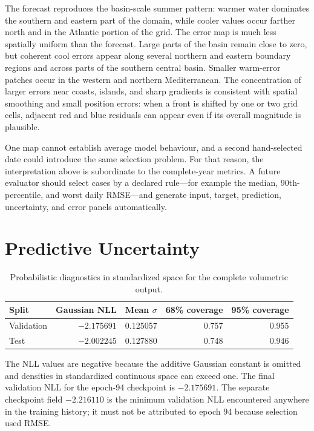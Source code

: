 The forecast reproduces the basin-scale summer pattern: warmer water dominates the southern and eastern part of the domain, while cooler values occur farther north and in the Atlantic portion of the grid. The error map is much less spatially uniform than the forecast. Large parts of the basin remain close to zero, but coherent cool errors appear along several northern and eastern boundary regions and across parts of the southern central basin. Smaller warm-error patches occur in the western and northern Mediterranean. The concentration of larger errors near coasts, islands, and sharp gradients is consistent with spatial smoothing and small position errors: when a front is shifted by one or two grid cells, adjacent red and blue residuals can appear even if its overall magnitude is plausible.

One map cannot establish average model behaviour, and a second hand-selected date could introduce the same selection problem. For that reason, the interpretation above is subordinate to the complete-year metrics. A future evaluator should select cases by a declared rule---for example the median, 90th-percentile, and worst daily RMSE---and generate input, target, prediction, uncertainty, and error panels automatically.

\section{Predictive Uncertainty}

\begin{table}[htbp]
\centering
\small
\caption{Probabilistic diagnostics in standardized space for the complete volumetric output.}
\label{tab:probabilistic-results}
\begin{tabular}{lrrrr}
\toprule
Split & Gaussian NLL & Mean $\sigma$ & 68\% coverage & 95\% coverage \\
\midrule
Validation & $-2.175691$ & 0.125057 & 0.757 & 0.955 \\
Test & $-2.002245$ & 0.127880 & 0.748 & 0.946 \\
\bottomrule
\end{tabular}
\end{table}

The NLL values are negative because the additive Gaussian constant is omitted and densities in standardized continuous space can exceed one. The final validation NLL for the epoch-94 checkpoint is $-2.175691$. The separate checkpoint field $-2.216110$ is the minimum validation NLL encountered anywhere in the training history; it must not be attributed to epoch 94 because selection used RMSE.

